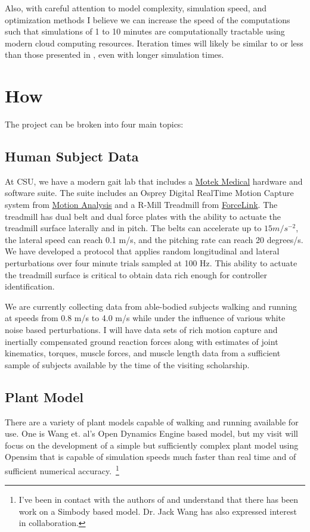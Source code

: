 \documentclass[11pt]{article}
\begin{document}
Also, with careful attention to model complexity, simulation speed, and
optimization methods I believe we can increase the speed of the computations
such that simulations of 1 to 10 minutes are computationally tractable using
modern cloud computing resources. Iteration times will likely be similar to or
less than those presented in \cite{Wang2012}, even with longer simulation
times.

\section*{How}

The project can be broken into four main topics:

\subsection*{Human Subject Data}

At CSU, we have a modern gait lab that includes a
\href{http://www.motekmedical.com}{Motek Medical} hardware and software suite.
The suite includes an Osprey Digital RealTime Motion Capture system from
\href{http://www.motionanalysis.com}{Motion Analysis} and a R-Mill Treadmill
from \href{http://www.forcelink.nl}{ForceLink}. The treadmill has dual belt and
dual force plates with the ability to actuate the treadmill surface laterally
and in pitch. The belts can accelerate up to $15 m/s^{-2}$, the lateral speed
can reach 0.1 m/s, and the pitching rate can reach 20 degrees/s. We have
developed a protocol that applies random longitudinal and lateral perturbations
over four minute trials sampled at 100 Hz. This ability to actuate the
treadmill surface is critical to obtain data rich enough for controller
identification.


We are currently collecting data from able-bodied subjects walking and running
at speeds from 0.8 m/s to 4.0 m/s while under the influence of various white
noise based perturbations. I will have data sets of rich motion capture and
inertially compensated ground reaction forces along with estimates of joint
kinematics, torques, muscle forces, and muscle length data from a sufficient
sample of subjects available by the time of the visiting scholarship.

\subsection*{Plant Model}
There are a variety of plant models capable of walking and running available
for use. One is Wang et. al's Open Dynamics Engine based model, but my visit
will focus on the development of a simple but sufficiently complex plant model
using Opensim that is capable of simulation speeds much faster than real time
and of sufficient numerical accuracy.~\footnote{I've been in contact with the
  authors of \cite{Wang2012} and understand that there has been work on a
  Simbody based model. Dr. Jack Wang has also expressed interest in
collaboration.}
\end{document}
